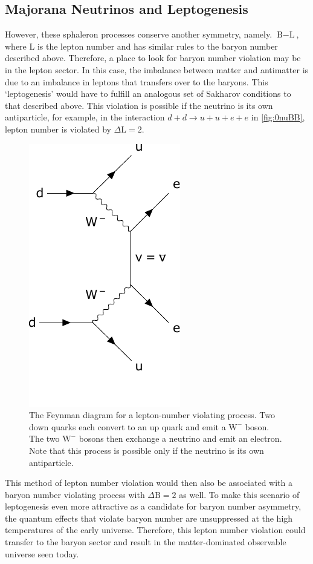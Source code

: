 \subsection{Majorana Neutrinos and Leptogenesis}
However, these sphaleron processes conserve another symmetry, namely. $\textrm{B}-\textrm{L}$, where L is the lepton number and has similar rules to the baryon number described above.
Therefore, a place to look for baryon number violation may be in the lepton sector.
In this case, the imbalance between matter and antimatter is due to an imbalance in leptons that transfers over to the baryons.
This `leptogenesis' would have to fulfill an analogous set of Sakharov conditions to that described above.
This violation is possible if the neutrino is its own antiparticle, for example, in the interaction $d + d \rightarrow u + u + e + e$ in \autoref{fig:0nuBB}, lepton number is violated by $\Delta\textrm{L}=2$.
\begin{figure}[tbph]
\centering
\includegraphics[width=0.35\linewidth]{Figures/0NuBB_clip.pdf}
\caption[The Feynman diagram for a lepton-number violating process]
{The Feynman diagram for a lepton-number violating process.
Two down quarks each convert to an up quark and emit a $\textrm{W}^{-}$ boson.
The two $\textrm{W}^{-}$ bosons then exchange a neutrino and emit an electron.
Note that this process is possible only if the neutrino is its own antiparticle.}
\label{fig:0nuBB}
\end{figure}
This method of lepton number violation would then also be associated with a baryon number violating process with $\Delta\textrm{B}=2$ as well.
To make this scenario of leptogenesis even more attractive as a candidate for baryon number asymmetry, the quantum effects that violate baryon number are unsuppressed at the high temperatures of the early universe.
Therefore, this lepton number violation could transfer to the baryon sector and result in the matter-dominated observable universe seen today.